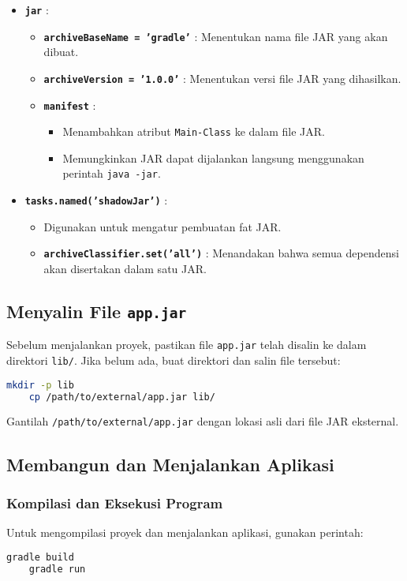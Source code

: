 \begin{itemize}
	\item \textbf{\texttt{jar}} :
	\begin{itemize}
		\item \textbf{\texttt{archiveBaseName = 'gradle'}} : Menentukan nama file JAR yang akan dibuat.
		\item \textbf{\texttt{archiveVersion = '1.0.0'}} : Menentukan versi file JAR yang dihasilkan.
		\item \textbf{\texttt{manifest}} :
		\begin{itemize}
			\item Menambahkan atribut \texttt{Main-Class} ke dalam file JAR.
			\item Memungkinkan JAR dapat dijalankan langsung menggunakan perintah \texttt{java -jar}.
		\end{itemize}
	\end{itemize}
	
	\item \textbf{\texttt{tasks.named('shadowJar')}} :
	\begin{itemize}
		\item Digunakan untuk mengatur pembuatan fat JAR.
		\item \textbf{\texttt{archiveClassifier.set('all')}} : Menandakan bahwa semua dependensi akan disertakan dalam satu JAR.
	\end{itemize}
\end{itemize}


\subsection{Menyalin File \texttt{app.jar}}
Sebelum menjalankan proyek, pastikan file \texttt{app.jar} telah disalin ke dalam direktori \texttt{lib/}. Jika belum ada, buat direktori dan salin file tersebut:

\begin{lstlisting}[language=bash]
	mkdir -p lib
	cp /path/to/external/app.jar lib/
\end{lstlisting}

Gantilah \texttt{/path/to/external/app.jar} dengan lokasi asli dari file JAR eksternal.

\subsection{Membangun dan Menjalankan Aplikasi}
\subsubsection{Kompilasi dan Eksekusi Program}
Untuk mengompilasi proyek dan menjalankan aplikasi, gunakan perintah:
\begin{lstlisting}[language=bash]
	gradle build
	gradle run
\end{lstlisting}

